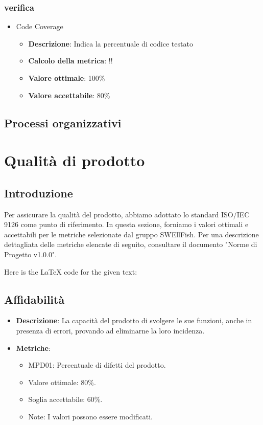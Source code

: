 \documentclass[12pt]{article}
\begin{document}
\subsubsection{verifica}
\begin{itemize}
	\item Code Coverage
	\begin{itemize}
		\item \textbf{Descrizione}: Indica la percentuale di codice testato
		\item \textbf{Calcolo della metrica}:  !!
		\item \textbf{Valore ottimale}: 100\%
		\item \textbf{Valore accettabile}: 80\%
	\end{itemize}
\end{itemize}

\subsection{Processi organizzativi}

\section{Qualità di prodotto}
\subsection{Introduzione}
Per assicurare la qualità del prodotto, abbiamo adottato lo standard ISO/IEC 9126 come punto di riferimento. In questa sezione, forniamo i valori ottimali e accettabili per le metriche selezionate dal gruppo SWEllFish. Per una descrizione dettagliata delle metriche elencate di seguito, consultare il documento "Norme di Progetto v1.0.0".



Here is the LaTeX code for the given text:

\subsection{Affidabilità}
\begin{itemize}
	\item \textbf{Descrizione}: La capacità del prodotto di svolgere le sue funzioni, anche in presenza di errori, provando ad eliminarne la loro incidenza.
	\item \textbf{Metriche}:
	      \begin{itemize}
		      \item MPD01: Percentuale di difetti del prodotto.
		      \item Valore ottimale: 80\%.
		      \item Soglia accettabile: 60\%.
		      \item Note: I valori possono essere modificati.
	      \end{itemize}
\end{itemize}
\end{document}

